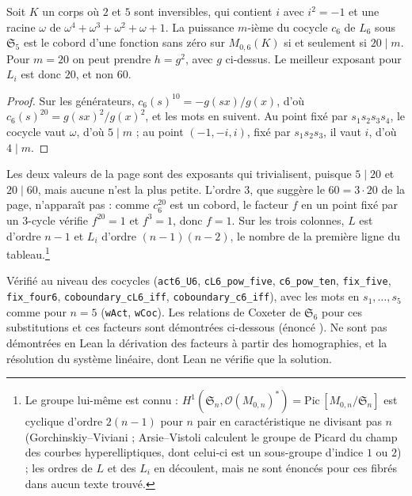 \begin{encadre}
\begin{contrexemple}[page 70, colonne $n = 6$, pour $L_i$ : le \q{$60\,?$} n'est pas le meilleur exposant\piste{146-equivariant-trivialising-exponents}]\label{ce:146-vingt}
Soit $K$ un corps où $2$ et $5$ sont inversibles, qui contient $i$ avec $i^2 = -1$ et une racine $\omega$ de $\omega^4 + \omega^3 + \omega^2 + \omega + 1$. La puissance $m$-ième du cocycle $c_6$ de $L_6$ sous $\mathfrak S_5$ est le cobord d'une fonction sans zéro sur $M_{0,6}(K)$ si et seulement si $20 \mid m$. Pour $m = 20$ on peut prendre $h = g^2$, avec $g$ ci-dessus. Le meilleur exposant pour $L_i$ est donc $20$, et non $60$.
\end{contrexemple}
\end{encadre}

\begin{proof}
Sur les générateurs, $c_6(s)^{10} = -g(sx)/g(x)$, d'où $c_6(s)^{20} = g(sx)^2/g(x)^2$, et les mots en suivent. Au point fixé par $s_1 s_2 s_3 s_4$, le cocycle vaut $\omega$, d'où $5 \mid m$ ; au point $(-1, -i, i)$, fixé par $s_1 s_2 s_3$, il vaut $i$, d'où $4 \mid m$.
\end{proof}

Les deux valeurs de la page sont des exposants qui trivialisent, puisque $5 \mid 20$ et $20 \mid 60$, mais aucune n'est la plus petite. L'ordre $3$, que suggère le $60 = 3 \cdot 20$ de la page, n'apparaît pas : comme $c_6^{20}$ est un cobord, le facteur $f$ en un point fixé par un $3$-cycle vérifie $f^{20} = 1$ et $f^3 = 1$, donc $f = 1$. Sur les trois colonnes, $L$ est d'ordre $n - 1$ et $L_i$ d'ordre $(n - 1)(n - 2)$, le nombre de la première ligne du tableau.\footnote{Le groupe lui-même est connu : $H^1(\mathfrak S_n, \mathcal O(M_{0,n})^*) = \mathrm{Pic}\,[M_{0,n}/\mathfrak S_n]$ est cyclique d'ordre $2(n - 1)$ pour $n$ pair en caractéristique ne divisant pas $n$ (Gorchinskiy--Viviani \cite[th.~3.6]{gorchinskiyviviani2008} ; Arsie--Vistoli \cite[th.~5.1]{arsievistoli2004} calculent le groupe de Picard du champ des courbes hyperelliptiques, dont celui-ci est un sous-groupe d'indice $1$ ou $2$) ; les ordres de $L$ et des $L_i$ en découlent, mais ne sont énoncés pour ces fibrés dans aucun texte trouvé.}

\begin{sloppypar}
\noindent Vérifié au niveau des cocycles (\texttt{act6\_U6}, \texttt{cL6\_pow\_five}, \texttt{c6\_pow\_ten}, \texttt{fix\_five}, \texttt{fix\_four6}, \texttt{coboundary\_cL6\_iff}, \texttt{coboundary\_c6\_iff}), avec les mots en $s_1, \ldots, s_5$ comme pour $n = 5$ (\texttt{wAct}, \texttt{wCoc}). Les relations de Coxeter de $\mathfrak S_6$ pour ces substitutions et ces facteurs sont démontrées ci-dessous (énoncé ). Ne sont pas démontrées en Lean la dérivation des facteurs à partir des homographies, et la résolution du système linéaire, dont Lean ne vérifie que la solution.
\end{sloppypar}


